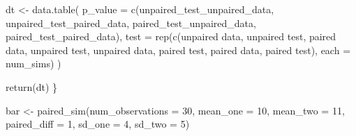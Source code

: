 \documentclass[
]{book}
\newenvironment{Shaded}{\begin{snugshade}}{\end{snugshade}}
\newcommand{\AttributeTok}[1]{\textcolor[rgb]{0.77,0.63,0.00}{#1}}
\newcommand{\DecValTok}[1]{\textcolor[rgb]{0.00,0.00,0.81}{#1}}
\newcommand{\FunctionTok}[1]{\textcolor[rgb]{0.00,0.00,0.00}{#1}}
\newcommand{\NormalTok}[1]{#1}
\newcommand{\OtherTok}[1]{\textcolor[rgb]{0.56,0.35,0.01}{#1}}
\newcommand{\StringTok}[1]{\textcolor[rgb]{0.31,0.60,0.02}{#1}}
\theoremstyle{definition}
\theoremstyle{definition}
\theoremstyle{definition}
\theoremstyle{definition}
\theoremstyle{remark}
\begin{document}
\begin{Shaded}
\begin{Highlighting}[]
\NormalTok{  dt }\OtherTok{\textless{}{-}} \FunctionTok{data.table}\NormalTok{(}
    \AttributeTok{p\_value =} \FunctionTok{c}\NormalTok{(unpaired\_test\_unpaired\_data, unpaired\_test\_paired\_data, }
\NormalTok{                paired\_test\_unpaired\_data,   paired\_test\_paired\_data), }
    \AttributeTok{test    =} \FunctionTok{rep}\NormalTok{(}\FunctionTok{c}\NormalTok{(}\StringTok{\textquotesingle{}unpaired data, unpaired test\textquotesingle{}}\NormalTok{, }\StringTok{\textquotesingle{}paired data, unpaired test\textquotesingle{}}\NormalTok{, }
                    \StringTok{\textquotesingle{}unpaired data, paired test\textquotesingle{}}\NormalTok{, }\StringTok{\textquotesingle{}paired data, paired test\textquotesingle{}}\NormalTok{), }\AttributeTok{each =}\NormalTok{ num\_sims)}
\NormalTok{  )}
  
  \FunctionTok{return}\NormalTok{(dt)}
\NormalTok{\}}
\end{Highlighting}
\end{Shaded}

\begin{Shaded}
\begin{Highlighting}[]
\NormalTok{bar }\OtherTok{\textless{}{-}} \FunctionTok{paired\_sim}\NormalTok{(}\AttributeTok{num\_observations =} \DecValTok{30}\NormalTok{,  }\AttributeTok{mean\_one =} \DecValTok{10}\NormalTok{, }\AttributeTok{mean\_two =} \DecValTok{11}\NormalTok{, }\AttributeTok{paired\_diff =} \DecValTok{1}\NormalTok{, }\AttributeTok{sd\_one =} \DecValTok{4}\NormalTok{, }\AttributeTok{sd\_two =} \DecValTok{5}\NormalTok{)}
\end{Highlighting}
\end{Shaded}
\end{document}

